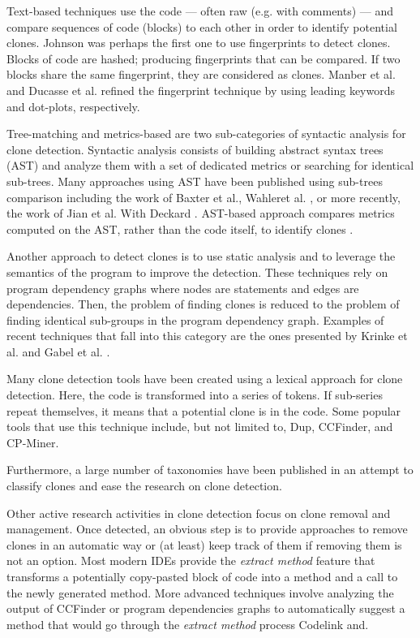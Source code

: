 \documentclass[conference]{IEEEtran}
\begin{document}
Text-based techniques use the code --- often raw (e.g. with comments) --- and compare sequences of code (blocks) to each other in order to identify potential clones. Johnson was perhaps the first one to use fingerprints to detect clones\cite{Johnson1993,Johnson1994}. Blocks of code are hashed; producing fingerprints that can be compared.
If two blocks share the same fingerprint, they are considered as clones.
Manber et al. \cite{Manber1994} and Ducasse et al.\cite{Ducasse1999} refined the fingerprint technique by using leading keywords and dot-plots, respectively.

Tree-matching and metrics-based are two sub-categories of syntactic analysis for clone detection.
Syntactic analysis consists of building abstract syntax trees (AST) and analyze them with a set of dedicated metrics or searching for identical sub-trees.
Many approaches using AST have been published using sub-trees comparison including the work of Baxter et al.\cite{Baxter1998}, Wahleret al. \cite{Wahler}, or more recently, the work of Jian et al. With Deckard \cite{Jiang2007}.
AST-based approach compares metrics computed on the AST, rather than the code itself, to identify clones \cite{Patenaude1999, Balazinska}.

Another approach to detect clones is to use static analysis and to leverage the semantics of the program to improve the detection.
These techniques rely on program dependency graphs where nodes are statements and edges are dependencies.
Then, the problem of finding clones is reduced to the problem of finding identical sub-groups in the program dependency graph.
Examples of recent techniques that fall into this category are the ones presented by Krinke et al.\cite{Krinke2001} and  Gabel et al. \cite{Gabel2008}.

Many clone detection tools have been created using a lexical approach for clone detection. Here, the code is transformed into a series of tokens. If sub-series repeat themselves, it means that a potential clone is in the code. Some popular tools that use this technique include, but not limited to, Dup\cite{Baker}, CCFinder\cite{Kamiya2002}, and CP-Miner\cite{Li2006}.

Furthermore, a large number of taxonomies have been published in an attempt to classify  clones and ease the research on clone detection\cite{Mayrand1996,Balazinska1999,Koschke2006,Bellon2007,NeilDavey,Kontogiannis,Kapser}.

Other active research activities in clone detection focus on clone removal and management. Once detected, an obvious step is to provide approaches to remove clones in an automatic way or (at least) keep track of them if removing them is not an option.
Most modern IDEs provide the \textit{extract method} feature that transforms a potentially copy-pasted block of code into a method and a call to the newly generated method\cite{Komondoor,higo2004refactoring}.
More advanced techniques involve analyzing the output of CCFinder\cite{Bomarius2004} or program dependencies graphs\cite{higo2004refactoring} to automatically suggest a method that would go through the \textit{extract method} process
Codelink\cite{Toomim} and\cite{Duala-Ekoko2007}.
\end{document}
